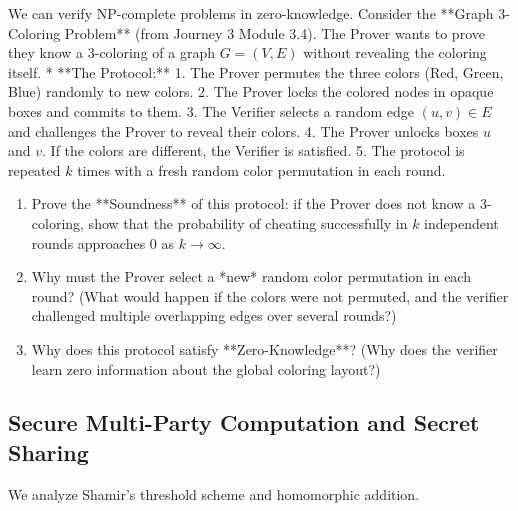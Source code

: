 \documentclass[12pt, a4paper]{book}
\begin{document}
\begin{explobox}
We can verify NP-complete problems in zero-knowledge.
Consider the **Graph 3-Coloring Problem** (from Journey 3 Module 3.4).
The Prover wants to prove they know a 3-coloring of a graph $G = (V, E)$ without revealing the coloring itself.
* **The Protocol:**
  1. The Prover permutes the three colors (Red, Green, Blue) randomly to new colors.
  2. The Prover locks the colored nodes in opaque boxes and commits to them.
  3. The Verifier selects a random edge $(u, v) \in E$ and challenges the Prover to reveal their colors.
  4. The Prover unlocks boxes $u$ and $v$. If the colors are different, the Verifier is satisfied.
  5. The protocol is repeated $k$ times with a fresh random color permutation in each round.
\begin{enumerate}[label=(\alph*), leftmargin=*]
  \item Prove the **Soundness** of this protocol: if the Prover does not know a 3-coloring, show that the probability of cheating successfully in $k$ independent rounds approaches 0 as $k \to \infty$.
  \item Why must the Prover select a *new* random color permutation in each round?
        (What would happen if the colors were not permuted, and the verifier challenged multiple overlapping edges over several rounds?)
  \item Why does this protocol satisfy **Zero-Knowledge**? (Why does the verifier learn zero information about the global coloring layout?)
\end{enumerate}
\end{explobox}

\subsection{Secure Multi-Party Computation and Secret Sharing}

We analyze Shamir's threshold scheme and homomorphic addition.
\end{document}
